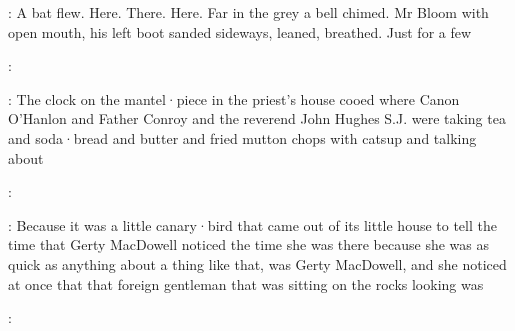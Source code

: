 \Bloom:
A bat flew.
Here.
There.
Here.
Far in the grey a bell chimed.
Mr
Bloom with open mouth,
his left boot sanded sideways,
leaned,
breathed.
Just for a few

:

:
The clock on the mantel·piece in the priest's house cooed
where Canon O'Hanlon
and Father Conroy
and the reverend John Hughes S.J.
were taking tea
and soda·bread and butter
and fried mutton chops with catsup
and talking about

:

:
Because it was a little canary·bird
that came out of its little house
to tell the time
that Gerty MacDowell noticed the time she was there
because she was as quick as anything
about a thing like that,
was Gerty MacDowell,
and she noticed at once that
that foreign gentleman
that was sitting on the rocks looking
was

:
